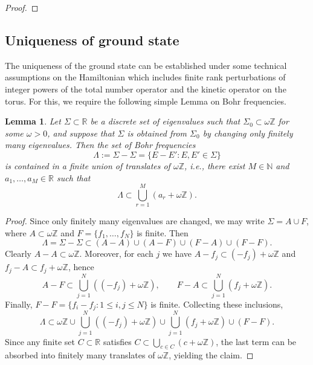 \documentclass[11pt]{amsart}
\newcommand{\1}{\mathbbm{1}}
\theoremstyle{plain}
\newtheorem{lemma}[theorem]{Lemma}
\theoremstyle{definition}
\theoremstyle{remark}
\numberwithin{equation}{section}
\begin{document}
\begin{proof}
\end{proof}

\subsection{Uniqueness of ground state}


The uniqueness of the ground state can be established under some technical assumptions on the Hamiltonian which includes finite rank perturbations of integer powers of the total number operator and the kinetic operator on the torus. 
For this, we require the following simple Lemma on Bohr frequencies.
\begin{lemma}
\label{lemm:spectrum}
Let $\Sigma\subset\mathbb R$ be a discrete set of eigenvalues such that $\Sigma_0\subset \omega\mathbb Z$ for some $\omega>0$, and suppose that $\Sigma$ is obtained from $\Sigma_0$ by changing only finitely many eigenvalues. Then the set of Bohr frequencies
\[
\Lambda:=\Sigma-\Sigma=\{E-E':E,E'\in \Sigma\}
\]
is contained in a finite union of translates of $\omega\mathbb Z$, i.e., there exist $M\in\mathbb N$ and $a_1,\dots,a_M\in\mathbb R$ such that
\[
\Lambda\subset \bigcup_{r=1}^M (a_r+\omega\mathbb Z).
\]
\end{lemma}

\begin{proof}
Since only finitely many eigenvalues are changed, we may write $\Sigma=A\cup F$, where $A\subset \omega\mathbb Z$ and $F=\{f_1,\dots,f_N\}$ is finite. Then
\[
\Lambda=\Sigma-\Sigma\subset (A-A)\cup (A-F)\cup (F-A)\cup (F-F).
\]
Clearly $A-A\subset \omega\mathbb Z$. Moreover, for each $j$ we have $A-f_j\subset (-f_j)+\omega\mathbb Z$ and $f_j-A\subset f_j+\omega\mathbb Z$, hence
\[
A-F\subset \bigcup_{j=1}^N((-f_j)+\omega\mathbb Z),\qquad
F-A\subset \bigcup_{j=1}^N(f_j+\omega\mathbb Z).
\]
Finally, $F-F=\{f_i-f_j:1\le i,j\le N\}$ is finite. Collecting these inclusions,
\[
\Lambda\subset \omega\mathbb Z
\cup \bigcup_{j=1}^N((-f_j)+\omega\mathbb Z)
\cup \bigcup_{j=1}^N(f_j+\omega\mathbb Z)
\cup (F-F).
\]
Since any finite set $C\subset\mathbb R$ satisfies $C\subset \bigcup_{c\in C}(c+\omega\mathbb Z)$, the last term can be absorbed into finitely many translates of $\omega\mathbb Z$, yielding the claim.
\end{proof}
\end{document}
